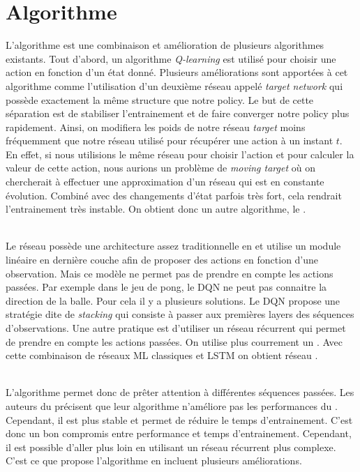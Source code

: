 \section{Algorithme}

L'algorithme  est une combinaison et amélioration de plusieurs algorithmes existants. Tout d'abord, un algorithme \textit{Q-learning} est utilisé pour choisir une action en fonction d'un état donné. Plusieurs améliorations sont apportées à cet algorithme comme l'utilisation d'un deuxième réseau appelé \textit{target network} qui possède exactement la même structure que notre policy. Le but de cette séparation est de stabiliser l'entrainement et de faire converger notre policy plus rapidement. Ainsi, on modifiera les poids de notre réseau \textit{target} moins fréquemment que notre réseau utilisé pour récupérer une action à un instant $t$. En effet, si nous utilisions le même réseau pour choisir l'action et pour calculer la valeur de cette action, nous aurions un problème de \textit{moving target} où on chercherait à effectuer une approximation d'un réseau qui est en constante évolution. Combiné avec des changements d'état parfois très fort, cela rendrait l'entrainement très instable. On obtient donc un autre algorithme, le .

~\\
Le réseau  possède une architecture assez traditionnelle en et utilise un module linéaire en dernière couche afin de proposer des actions en fonction d'une observation. Mais ce modèle ne permet pas de prendre en compte les actions passées. Par exemple dans le jeu de pong, le DQN ne peut pas connaitre la direction de la balle. Pour cela il y a plusieurs solutions. Le DQN propose une stratégie dite de \textit{stacking} qui consiste à passer aux premières layers des séquences d'observations. Une autre pratique est d'utiliser un réseau récurrent  qui permet de prendre en compte les actions passées. On utilise plus courrement un . Avec cette combinaison de réseaux ML classiques et LSTM on obtient réseau .

~\\
L'algorithme  permet donc de prêter attention à différentes séquences passées. Les auteurs du  précisent que leur algorithme n'améliore pas les performances du . Cependant, il est plus stable et permet de réduire le temps d'entrainement. C'est donc un bon compromis entre performance et temps d'entrainement. Cependant, il est possible d'aller plus loin en utilisant un réseau récurrent plus complexe. C'est ce que propose l'algorithme  en incluent plusieurs améliorations.

